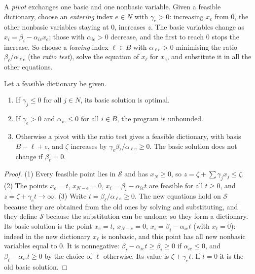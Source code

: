 A \emph{pivot} exchanges one basic and one nonbasic variable. Given a feasible dictionary, choose an \emph{entering} index $e\in N$ with $\gamma_e>0$: increasing $x_e$ from $0$, the other nonbasic
variables staying at $0$, increases $z$. The basic variables change as $x_i=\beta_i-\alpha_{ie}x_e$; those with $\alpha_{ie}>0$ decrease, and the first to reach $0$ stops the increase. So choose a
\emph{leaving} index $\ell\in B$ with $\alpha_{\ell e}>0$ minimising the ratio $\beta_\ell/\alpha_{\ell e}$ (the \emph{ratio test}), solve the equation of $x_\ell$ for $x_e$, and substitute it in all the other equations.

\begin{proposition}\label{prop:pivot}
Let a feasible dictionary be given.
\begin{enumerate}
\item If $\gamma_j\le0$ for all $j\in N$, its basic solution is optimal.
\item If $\gamma_e>0$ and $\alpha_{ie}\le0$ for all $i\in B$, the program is unbounded.
\item Otherwise a pivot with the ratio test gives a feasible dictionary, with basis $B-\ell+e$, and $\zeta$ increases by $\gamma_e\beta_\ell/\alpha_{\ell e}\ge0$. The basic solution does not change if $\beta_\ell=0$.
\end{enumerate}
\end{proposition}
\begin{proof}
(1) Every feasible point lies in $\mathcal S$ and has $x_N\ge0$, so $z=\zeta+\sum\gamma_jx_j\le\zeta$. (2) The points $x_e=t$, $x_{N-e}=0$, $x_i=\beta_i-\alpha_{ie}t$ are feasible for all $t\ge0$, and
$z=\zeta+\gamma_et\to\infty$. (3) Write $t=\beta_\ell/\alpha_{\ell e}\ge0$. The new equations hold on $\mathcal S$ because they are obtained from the old ones by solving and substituting, and they define $\mathcal S$ because the
substitution can be undone; so they form a dictionary. Its basic solution is the point $x_e=t$, $x_{N-e}=0$, $x_i=\beta_i-\alpha_{ie}t$ (with $x_\ell=0$): indeed in the new dictionary $x_\ell$ is nonbasic, and this point has all new
nonbasic variables equal to $0$. It is nonnegative: $\beta_i-\alpha_{ie}t\ge\beta_i\ge0$ if $\alpha_{ie}\le0$, and $\beta_i-\alpha_{ie}t\ge0$ by the choice of $\ell$ otherwise. Its value is $\zeta+\gamma_et$. If $t=0$ it is the old basic solution.
\end{proof}

